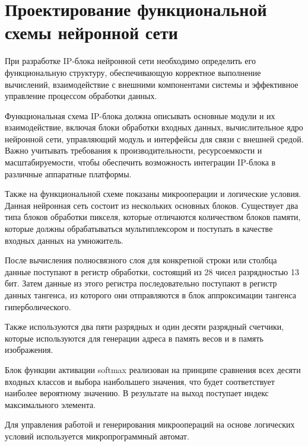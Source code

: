 
\section{Проектирование функциональной схемы нейронной сети}
\hspace*{12.5 mm}При разработке IP-блока нейронной сети необходимо определить 
его функциональную структуру, обеспечивающую корректное выполнение вычислений, 
взаимодействие с внешними компонентами системы и эффективное управление 
процессом обработки данных.

Функциональная схема IP-блока должна описывать основные модули и их 
взаимодействие, включая блоки обработки входных данных, вычислительное ядро 
нейронной сети, управляющий модуль и интерфейсы для связи с внешней средой. 
Важно учитывать требования к производительности, ресурсоемкости и 
масштабируемости, чтобы обеспечить возможность интеграции IP-блока в различные 
аппаратные платформы.

Также на функциональной схеме показаны микрооперации и логические условия. 
Данная нейронная сеть состоит из нескольких основных блоков. Существует два 
типа блоков обработки пикселя, которые отличаются количеством блоков памяти,
которые должны обрабатываться мультиплексором и поступать в качестве входных 
данных на умножитель.

После вычисления полносвязного слоя для конкретной строки или столбца данные 
поступают в регистр обработки, состоящий из 28 чисел разрядностью 13 бит. 
Затем данные из этого регистра последовательно поступают в регистр данных 
тангенса, из которого они отправляются в блок аппроксимации тангенса 
гиперболического.

Также используются два пяти разрядных и один десяти разрядный счетчики, которые
используются для генерации адреса в память весов и в память изображения.

Блок функции активации softmax реализован на принципе сравнения всех десяти 
входных классов и выбора наибольшего значения, что будет соответствует наиболее
вероятному значению. В результате на выход поступает индекс максимального 
элемента.

Для управления работой и генерирования микроопераций на основе логических 
условий используется микропрограммный автомат.

